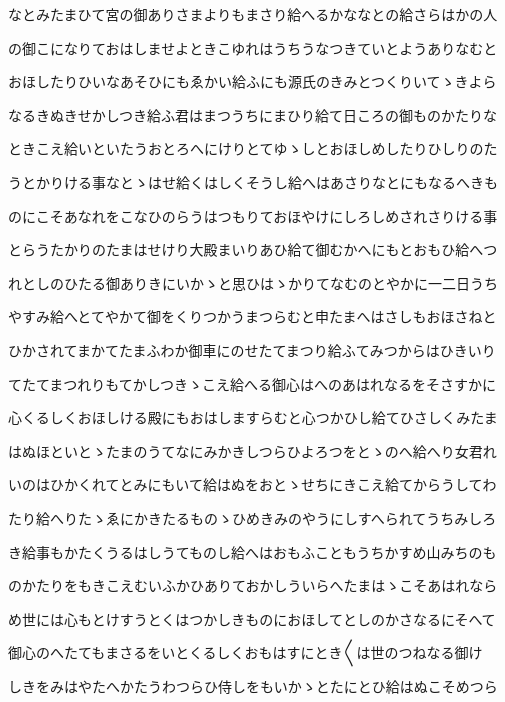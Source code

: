 \documentclass[a4paper,11pt,landscape]{ltjtarticle}
\begin{document}
\par\medskip
なとみたまひて宮の御ありさまよりもまさり給へるかななとの給さらはかの人
\par\medskip
の御こになりておはしませよときこゆれはうちうなつきていとようありなむと
\par\medskip
おほしたりひいなあそひにもゑかい給ふにも源氏のきみとつくりいてゝきよら
\par\medskip
なるきぬきせかしつき給ふ君はまつうちにまひり給て日ころの御ものかたりな
\par\medskip
ときこえ給いといたうおとろへにけりとてゆゝしとおほしめしたりひしりのた
\par\medskip
うとかりける事なとゝはせ給くはしくそうし給へはあさりなとにもなるへきも
\par\medskip
のにこそあなれをこなひのらうはつもりておほやけにしろしめされさりける事
\par\medskip
とらうたかりのたまはせけり大殿まいりあひ給て御むかへにもとおもひ給へつ
\par\medskip
れとしのひたる御ありきにいかゝと思ひはゝかりてなむのとやかに一二日うち
\par\medskip
やすみ給へとてやかて御をくりつかうまつらむと申たまへはさしもおほさねと
\par\medskip
ひかされてまかてたまふわか御車にのせたてまつり給ふてみつからはひきいり
\par\medskip
てたてまつれりもてかしつきゝこえ給へる御心はへのあはれなるをそさすかに
\par\medskip
心くるしくおほしける殿にもおはしますらむと心つかひし給てひさしくみたま
\par\medskip
はぬほといとゝたまのうてなにみかきしつらひよろつをとゝのへ給へり女君れ
\par\medskip
いのはひかくれてとみにもいて給はぬをおとゝせちにきこえ給てからうしてわ
\par\medskip
たり給へりたゝゑにかきたるものゝひめきみのやうにしすへられてうちみしろ
\par\medskip
き給事もかたくうるはしうてものし給へはおもふこともうちかすめ山みちのも
\par\medskip
のかたりをもきこえむいふかひありておかしういらへたまはゝこそあはれなら
\par\medskip
め世には心もとけすうとくはつかしきものにおほしてとしのかさなるにそへて
\par\medskip
御心のへたてもまさるをいとくるしくおもはすにとき〱は世のつねなる御け
\par\medskip
しきをみはやたへかたうわつらひ侍しをもいかゝとたにとひ給はぬこそめつら
\end{document}
